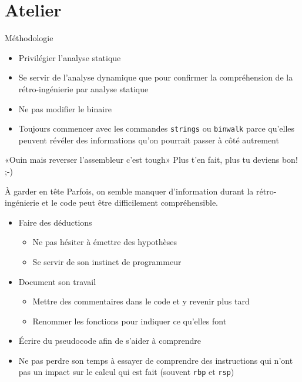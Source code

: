 \documentclass[10pt,xcolor={table,dvipsnames},t]{beamer}
\begin{document}
\section{Atelier}

\begin{frame}{Méthodologie}
    \begin{itemize}
        \item Privilégier l'analyse statique
        \item Se servir de l'analyse dynamique que pour confirmer la compréhension de la rétro-ingénierie par analyse statique
        \item Ne pas modifier le binaire
        \item Toujours commencer avec les commandes \texttt{strings} ou \texttt{binwalk} parce qu'elles peuvent révéler des informations qu'on pourrait passer à côté autrement
    \end{itemize}
    
    \begin{block}{«Ouin mais reverser l'assembleur c'est tough»}
        Plus t'en fait, plus tu deviens bon!  ;-)
    \end{block}
\end{frame}


\begin{frame}{À garder en tête}
    Parfois, on semble manquer d'information durant la rétro-ingénierie et le code peut être difficilement compréhensible. 
    \begin{itemize}
        \item Faire des déductions
        \begin{itemize}
            \item Ne pas hésiter à émettre des hypothèses
            \item Se servir de son instinct de programmeur
        \end{itemize}
        \item Document son travail
        \begin{itemize}
            \item Mettre des commentaires dans le code et y revenir plus tard
            \item Renommer les fonctions pour indiquer ce qu'elles font
        \end{itemize}
        \item Écrire du pseudocode afin de s'aider à comprendre
        \item Ne pas perdre son temps à essayer de comprendre des instructions qui n'ont pas un impact sur le calcul qui est fait (souvent \texttt{rbp} et \texttt{rsp})
    \end{itemize}
\end{frame}
\end{document}
